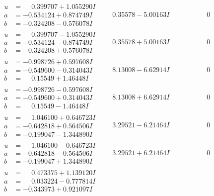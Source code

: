 \documentclass[1p]{elsarticle_modified}
\theoremstyle{definition}
\begin{document}
$$\begin{array}{c|c|c}
\begin{aligned}
u &= \phantom{-}0.399707 + 1.055290 I \\
a &= -0.534124 + 0.874749 I \\
b &= -0.324208 - 0.576078 I\end{aligned}
 & \phantom{-}0.35578 - 5.00163 I & \phantom{-0.000000 } 0 \\ \hline\begin{aligned}
u &= \phantom{-}0.399707 - 1.055290 I \\
a &= -0.534124 - 0.874749 I \\
b &= -0.324208 + 0.576078 I\end{aligned}
 & \phantom{-}0.35578 + 5.00163 I & \phantom{-0.000000 } 0 \\ \hline\begin{aligned}
u &= -0.998726 + 0.597608 I \\
a &= -0.549600 - 0.314043 I \\
b &= \phantom{-}0.15549 + 1.46448 I\end{aligned}
 & \phantom{-}8.13008 - 6.62914 I & \phantom{-0.000000 } 0 \\ \hline\begin{aligned}
u &= -0.998726 - 0.597608 I \\
a &= -0.549600 + 0.314043 I \\
b &= \phantom{-}0.15549 - 1.46448 I\end{aligned}
 & \phantom{-}8.13008 + 6.62914 I & \phantom{-0.000000 } 0 \\ \hline\begin{aligned}
u &= \phantom{-}1.046100 + 0.646723 I \\
a &= -0.642818 + 0.564506 I \\
b &= -0.199047 - 1.344890 I\end{aligned}
 & \phantom{-}3.29521 - 6.21464 I & \phantom{-0.000000 } 0 \\ \hline\begin{aligned}
u &= \phantom{-}1.046100 - 0.646723 I \\
a &= -0.642818 - 0.564506 I \\
b &= -0.199047 + 1.344890 I\end{aligned}
 & \phantom{-}3.29521 + 6.21464 I & \phantom{-0.000000 } 0 \\ \hline\begin{aligned}
u &= \phantom{-}0.473375 + 1.139120 I \\
a &= \phantom{-}0.033224 - 0.777814 I \\
b &= -0.343973 + 0.921097 I\end{aligned}

\end{array}$$
\end{document}
